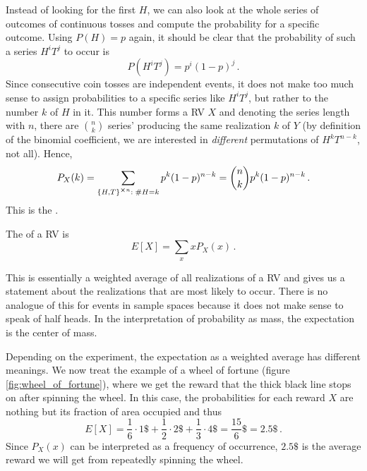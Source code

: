 \begin{ex}
Instead of looking for the first $H$, we can also look at the whole series of outcomes of continuous tosses and compute the probability for a specific outcome. Using $P(H) = p$ again, it should be clear that the probability of such a series $H^i T^j$ to occur is
\begin{equation*}
P(H^i T^j) = p^i (1 - p)^j \, .
\end{equation*}
Since consecutive coin tosses are independent events, it does not make too much sense to assign probabilities to a specific series like $H^i T^j$, but rather to the number $k$ of $H$ in it. This number forms a RV $X$ and denoting the series length with $n$, there are $\binom{n}{k}$ series' producing the same realization $k$ of $Y$ (by definition of the binomial coefficient, we are interested in \emph{different} permutations of $H^k T^{n - k}$, not all). Hence,
\begin{equation*}
P_X(k) = \sum_{\qty{H, T}^{\cross n}: \; \# H = k} p^k (1 - p)^{n - k} = \binom{n}{k} p^k (1 - p)^{n - k} \, .
\end{equation*}
This is the .
\end{ex}


\begin{defi}[Expectation]
The  of a RV is
\begin{equation}
E[X] = \sum_x x P_X(x) \, .
\end{equation}
\end{defi}
This is essentially a weighted average of all realizations of a RV and gives us a statement about the realizations that are most likely to occur. There is no analogue of this for events in sample spaces because it does not make sense to speak of half heads. In the interpretation of probability as mass, the expectation is the center of mass.


\begin{ex}
Depending on the experiment, the expectation as a weighted average has different meanings. We now treat the example of a wheel of fortune (figure \ref{fig:wheel_of_fortune}), where we get the reward that the thick black line stops on after spinning the wheel. In this case, the probabilities for each reward $X$ are nothing but its fraction of area occupied and thus
\begin{equation*}
E[X] = \frac{1}{6} \cdot 1\$ + \frac{1}{2} \cdot 2\$ + \frac{1}{3} \cdot 4\$ = \frac{15}{6} \$ = 2.5\$ \, .
\end{equation*}
Since $P_X(x)$ can be interpreted as a frequency of occurrence, $2.5\$$ is the average reward we will get from repeatedly spinning the wheel.
\end{ex}



